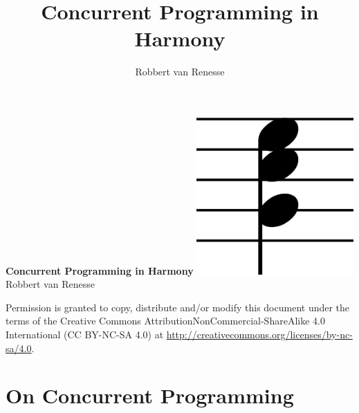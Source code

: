 \documentclass{report}
\title{Concurrent Programming in Harmony}
\author{Robbert van Renesse}
\begin{document}
\begin{titlepage}
    \centering
    \vfill
    {\bfseries\huge
        Concurrent Programming in Harmony
    }
    \vfill
    \includegraphics[width=6cm]{figures/harmony-icon.png}
    \vfill
    \vfill
    \hfill \Large Robbert van Renesse
\end{titlepage}

Permission is granted to copy, distribute and/or modify this
document under the terms of the
Creative Commons AttributionNonCommercial-ShareAlike 4.0 International
(CC BY-NC-SA 4.0) at
\url{http://creativecommons.org/licenses/by-nc-sa/4.0}.

\tableofcontents
\listoffigures

\chapter{On Concurrent Programming}
\end{document}
